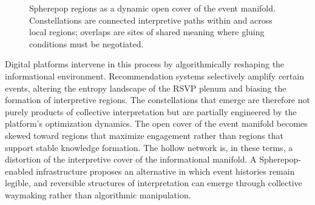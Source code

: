 \documentclass[12pt,a4paper]{article}
\begin{document}
\begin{figure}[H]
\centering
{}
\caption{Spherepop regions as a dynamic open cover of the event manifold. Constellations are
connected interpretive paths within and across local regions; overlaps are sites of shared
meaning where gluing conditions must be negotiated.}
\label{fig:event-manifold}
\end{figure}

Digital platforms intervene in this process by algorithmically reshaping the informational
environment. Recommendation systems selectively amplify certain events, altering the entropy
landscape of the RSVP plenum and biasing the formation of interpretive regions. The
constellations that emerge are therefore not purely products of collective interpretation but
are partially engineered by the platform's optimization dynamics. The open cover of the event
manifold becomes skewed toward regions that maximize engagement rather than regions that
support stable knowledge formation. The hollow network is, in these terms, a distortion of the
interpretive cover of the informational manifold. A Spherepop-enabled infrastructure proposes
an alternative in which event histories remain legible, and reversible structures of
interpretation can emerge through collective waymaking rather than algorithmic manipulation.
\end{document}
